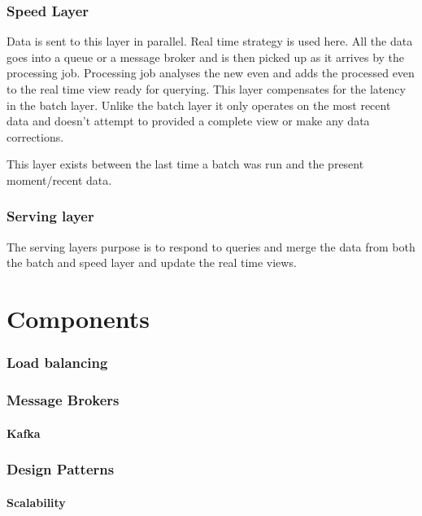 \documentclass[a4paper, 11pt]{book}
\begin{document}
    \subsection{Speed Layer}
    Data is sent to this layer in parallel.
    Real time strategy is used here.
    All the data goes into a queue or a message broker and is then picked up as it arrives by the processing job.
    Processing job analyses the new even and adds the processed even to the real time view ready for querying.
    This layer compensates for the latency in the batch layer.
    Unlike the batch layer it only operates on the most recent data and doesn't attempt to provided a complete view or make any data corrections.

    This layer exists between the last time a batch was run and the present moment/recent data.

    \subsection{Serving layer}
    The serving layers purpose is to respond to queries and merge the data from both the batch and speed layer and update the real time views.


    \chapter{Components}

    \subsection{Load balancing}

    \subsection{Message Brokers}

    \subsubsection{Kafka}

    \subsection{Design Patterns}

    \subsubsection{Scalability}
\end{document}
